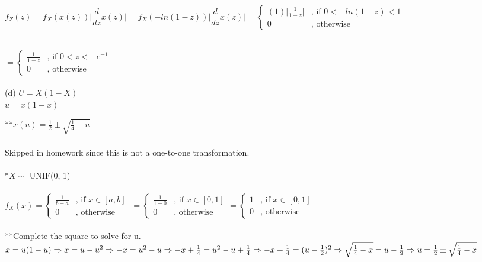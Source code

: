 $f_Z(z) = f_X(x(z)) \bigg| \dfrac{d}{dz} x(z) \bigg|
= f_X(-ln(1-z)) \bigg| \dfrac{d}{dz} x(z) \bigg|
=\begin{cases}
	(1) \Big| \frac{1}{1-z} \Big|  & \text{,	if } 0<-ln(1-z)<1 \\
	0 & \text{,		otherwise}
\end{cases}$\\
\vspace{1mm}\\
\par \hspace{3.55in}
$=\begin{cases}
	\frac{1}{1-z}  & \text{,	if } 0<z<-e^{-1}\\
	0 & \text{,		otherwise}
\end{cases}
$\\
\vspace{0.25in}\\
(d) $U = X(1 - X)$\\

$u = x(1-x)$ \par
**$ x(u) = \frac{1}{2} \pm \sqrt{\frac{1}{4}-u}$\\
\vspace{0.05in}\\
Skipped in homework since this is not a one-to-one transformation. \\
\vspace{0.25in}\\
*$X \sim$ UNIF(0, 1)\\
\vspace{1mm}\\
$f_X(x) =
\begin{cases}
	\frac{1}{b-a} & \text{,	if } x \in [a,b]\\
	0 & \text{,		otherwise}
\end{cases}\
=\begin{cases}
	\frac{1}{1-0} & \text{,	if } x \in [0,1]\\
	0 & \text{,		otherwise}
\end{cases}
=\begin{cases}
	1 & \text{,	if } x \in [0,1]\\
	0 & \text{,		otherwise}
\end{cases}
$\\
\vspace{0.25in}\\
**Complete the square to solve for u. \\
$x = u(1-u)\\
\Rightarrow x = u-u^2\\
\Rightarrow -x = u^2 - u\\
\Rightarrow -x + \frac{1}{4} = u^2 - u + \frac{1}{4}\\  
\Rightarrow -x + \frac{1}{4} = (u - \frac{1}{2})^2\\
\Rightarrow \sqrt{\frac{1}{4}-x} = u - \frac{1}{2}\\
\Rightarrow u = \frac{1}{2} \pm \sqrt{\frac{1}{4}-x}
$\\

